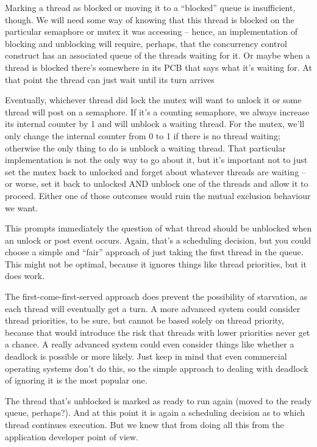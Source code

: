 Marking a thread as blocked or moving it to a ``blocked'' queue is insufficient, though. We will need some way of knowing that this thread is blocked on the particular semaphore or mutex it was accessing -- hence, an implementation of blocking and unblocking will require, perhaps, that the concurrency control construct has an associated queue of the threads waiting for it. Or maybe when a thread is blocked there's somewhere in its PCB that says what it's waiting for. At that point the thread can just wait until its turn arrives

Eventually, whichever thread did lock the mutex will want to unlock it or some thread will post on a semaphore. If it's a counting semaphore, we always increase its internal counter by 1 and will unblock a waiting thread. For the mutex, we'll only change the internal counter from 0 to 1 if there is no thread waiting; otherwise the only thing to do is unblock a waiting thread. That particular implementation is not the only way to go about it, but it's important not to just set the mutex back to unlocked and forget about whatever threads are waiting -- or worse, set it back to unlocked AND unblock one of the threads and allow it to proceed. Either one of those outcomes would ruin the mutual exclusion behaviour we want.

This prompts immediately the question of what thread should be unblocked when an unlock or post event occurs. Again, that's a scheduling decision, but you could choose a simple and ``fair'' approach of just taking the first thread in the queue. This might not be optimal, because it ignores things like thread priorities, but it does work. 

The first-come-first-served approach does prevent the possibility of starvation, as each thread will eventually get a turn. A more advanced system could consider thread priorities, to be sure, but cannot be based solely on thread priority, because that would introduce the risk that threads with lower priorities never get a chance. A really advanced system could even consider things like whether a deadlock is possible or more likely. Just keep in mind that even commercial operating systems don't do this, so the simple approach to dealing with deadlock of ignoring it is the most popular one. 

The thread that's unblocked is marked as ready to run again (moved to the ready queue, perhaps?). And at this point it is again a scheduling decision as to which thread continues execution. But we knew that from doing all this from the application developer point of view.

